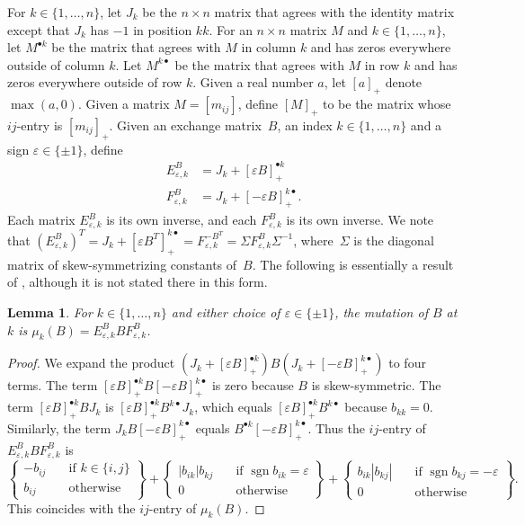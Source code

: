 \documentclass{amsart}
\newtheorem{lemma}[proposition]{Lemma}
\theoremstyle{definition}
\theoremstyle{remark}
\numberwithin{equation}{section}
\newcommand{\ep}{\varepsilon}
\newcommand{\sgn}{\operatorname{sgn}}
\newcommand{\set}[1]{{\lbrace #1 \rbrace}}
\newcommand{\0}{{\mathbf{0}}}
\newcommand{\margin}[1]{\say[N]{#1}}
\begin{document}
For $k\in\set{1,\ldots,n}$, let $J_k$ be the $n\times n$ matrix that agrees with the identity matrix except that $J_k$ has $-1$ in position $kk$.
For an $n\times n$ matrix $M$ and $k\in\set{1,\ldots,n}$, let $M^{\bullet k}$ be the matrix that agrees with $M$ in column $k$ and has zeros everywhere outside of column $k$.
Let $M^{k\bullet}$ be the matrix that agrees with $M$ in row $k$ and has zeros everywhere outside of row $k$.
Given a real number $a$, let $[a]_+$ denote $\max(a,0)$.
Given a matrix $M=[m_{ij}]$, define $[M]_+$ to be the matrix whose $ij$-entry is $[m_{ij}]_+$.
Given an exchange matrix~$B$, an index $k\in\set{1,\ldots,n}$ and a sign $\ep\in\set{\pm1}$, define
\begin{align*}
E_{\ep,k}^B&=J_k+[\ep B]_+^{\bullet k}\\
F_{\ep,k}^B&=J_k+[-\ep B]_+^{k\bullet}.
\end{align*}
Each matrix $E_{\ep,k}^B$ is its own inverse, and each $F_{\ep,k}^B$ is its own inverse.
We note that $(E_{\ep,k}^B)^T=J_k+[\ep B^T]_+^{k\bullet}=F_{\ep,k}^{-B^T}=\Sigma F_{\ep,k}^B\Sigma^{-1}$, where~$\Sigma$ is the diagonal matrix of skew-symmetrizing constants of~$B$.
The following is essentially a result of \cite{NZ12}, although it is not stated there in this form.  \margin{Do I have this attribution right?}
\begin{lemma}\label{EBF trick}
For $k\in\set{1,\ldots,n}$ and either choice of $\ep\in\set{\pm1}$, the mutation of $B$ at $k$ is $\mu_k(B)=E_{\ep,k}^BBF_{\ep,k}^B$.
\end{lemma}
\begin{proof}
We expand the product $(J_k+[\ep B]_+^{\bullet k})B(J_k+[-\ep B]_+^{k\bullet})$ to four terms.
The term $[\ep B]_+^{\bullet k}B[-\ep B]_+^{k\bullet}$ is zero because $B$ is skew-symmetric.
The term $[\ep B]_+^{\bullet k}BJ_k$ is $[\ep B]_+^{\bullet k}B^{k\bullet}J_k$, which equals $[\ep B]_+^{\bullet k}B^{k\bullet}$ because $b_{kk}=0$.
Similarly, the term $J_kB[-\ep B]_+^{k\bullet}$ equals $B^{\bullet k}[-\ep B]_+^{k\bullet}$.
Thus the $ij$-entry of $E_{\ep,k}^BBF_{\ep,k}^B$ is 
\[
\left\{\begin{aligned}
-b_{ij}&\quad\text{if }k\in\set{i,j}\\
b_{ij}&\quad\text{otherwise}
\end{aligned}\right\}
+
\left\{\begin{aligned}
|b_{ik}|b_{kj}&\quad\text{if }\sgn b_{ik}=\ep\\
0&\quad\text{otherwise}
\end{aligned}\right\}
+
\left\{\begin{aligned}
b_{ik}|b_{kj}|&\quad\text{if }\sgn b_{kj}=-\ep\\
0&\quad\text{otherwise}
\end{aligned}\right\}.
\]
This coincides with the $ij$-entry of $\mu_k(B)$.
\end{proof}
\end{document}
